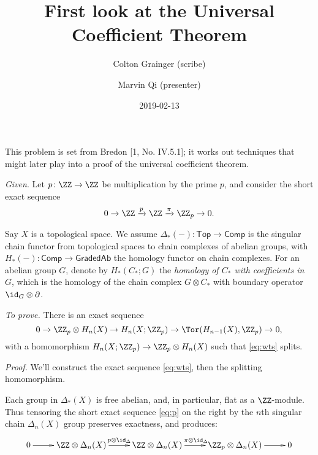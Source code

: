 \documentclass[10pt]{amsart}
\title{First look at the Universal Coefficient Theorem}
\author{Colton Grainger (scribe) \and Marvin Qi (presenter)}
\date{2019-02-13}
\begin{document}
\maketitle



This problem is set from Bredon {[}1, No. IV.5.1{]}; it works out
techniques that might later play into a proof of the universal
coefficient theorem.

\emph{Given}. Let \(p \colon \ZZ \to \ZZ\) be multiplication by the
prime \(p\), and consider the short exact sequence \begin{equation}
0 \to \ZZ \xrightarrow{p} \ZZ \xrightarrow{\pi} \ZZ_p \to 0.
\label{eq:p}
\end{equation}

Say \(X\) is a topological space. We assume
\(\Delta_*(-) \colon \mathsf{Top} \to \mathsf{Comp}\) is the singular
chain functor from topological spaces to chain complexes of abelian
groups, with \(H_*(-) \colon \mathsf{Comp} \to \mathsf{GradedAb}\) the
homology functor on chain complexes. For an abelian group \(G\), denote
by \(H_*(C_*; G)\) the \emph{homology of \(C_*\) with coefficients in
\(G\)}, which is the homology of the chain complex \(G \otimes C_*\)
with boundary operator \(\id_G \otimes \partial\).

\emph{To prove.} There is an exact sequence \begin{equation}
0 \to \ZZ_p \otimes H_n(X) \to H_n(X;\ZZ_p) \to \Tor(H_{n-1}(X), \ZZ_p) \to 0,
\label{eq:wts}
\end{equation} with a homomorphism
\(H_n(X; \ZZ_p) \to \ZZ_p \otimes H_n(X)\) such that \eqref{eq:wts}
splits.

\emph{Proof.} We'll construct the exact sequence \eqref{eq:wts}, then
the splitting homomorphism.

Each group in \(\Delta_*(X)\) is free abelian, and, in particular, flat
as a \(\ZZ\)-module. Thus tensoring the short exact sequence
\eqref{eq:p} on the right by the \(n\)th singular chain \(\Delta_n(X)\)
group preserves exactness, and produces: \begin{equation}
\xymatrix{
0 \ar[r] & \ZZ\otimes \Delta_n(X) \ar[r]^{p\otimes \id_\Delta} & \ZZ\otimes \Delta_n(X) \ar[r]^{\pi\otimes \id_\Delta} & \ZZ_p \otimes\Delta_n(X) \ar[r]&  0
}
\label{eq:level}
\end{equation}
\end{document}
